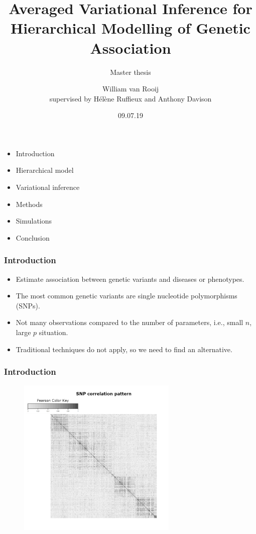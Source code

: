 \documentclass{beamer}
\begin{document}
\SetEndCharOfAlgoLine{}

\title{Averaged Variational Inference for Hierarchical Modelling of Genetic Association}
\subtitle{Master thesis}
\author{William van Rooij\\
{\small supervised by Hélène Ruffieux and Anthony Davison}}
\date{09.07.19}
\maketitle
\begin{frame}
\begin{itemize}
\item Introduction
\item Hierarchical model
\item Variational inference
\item Methods
\item Simulations
\item Conclusion
\end{itemize}
\end{frame}

\begin{frame}
\frametitle{Introduction}
\begin{itemize}
\item Estimate association between genetic variants and diseases or phenotypes.
\item The most common genetic variants are single nucleotide polymorphisms (SNPs).
\item Not many observations compared to the number of parameters, i.e., small $n$, large $p$ situation.
\item Traditional techniques do not apply, so we need to find an alternative.
\end{itemize}
\end{frame}

\begin{frame}
\frametitle{Introduction}
\begin{figure}
\includegraphics[width=3in]{images/corrRealSNPs.pdf}
\end{figure}
\end{frame}
\end{document}
